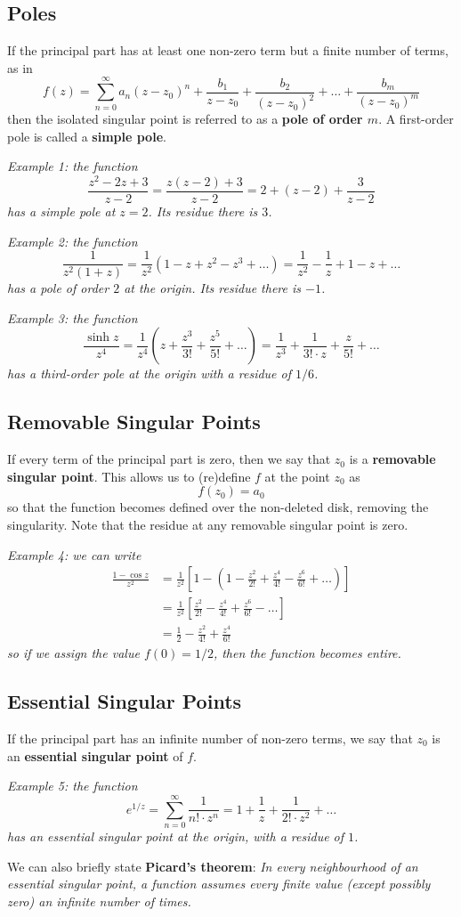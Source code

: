 \documentclass{article}
\renewcommand{\emph}{\textbf}
\begin{document}
\subsection{Poles}
If the principal part has at least one non-zero term but a finite number of terms, as in
\[
	f(z) = \sum_{n=0}^\infty a_n (z - z_0)^n
	+ \frac{b_1}{z - z_0}
	+ \frac{b_2}{(z - z_0)^2} + \dots
	+ \frac{b_m}{(z - z_0)^m}
\]
then the isolated singular point is referred to as a \emph{pole of order $m$}. A first-order pole is called a \emph{simple pole}.

\textit{Example 1: the function
\[
	\frac{z^2 - 2z + 3}{z - 2}
	= \frac{z(z-2) + 3}{z - 2}
	= 2 + (z - 2) + \frac{3}{z - 2}
\]
has a simple pole at $z = 2$. Its residue there is $3$.}

\textit{Example 2: the function
\[
	\frac{1}{z^2(1 + z)}
	= \frac{1}{z^2}(1 - z + z^2 - z^3 + \dots)
	= \frac{1}{z^2} - \frac{1}{z} + 1 - z + \dots
\]
has a pole of order $2$ at the origin. Its residue there is $-1$.}

\textit{Example 3: the function
\[
	\frac{\sinh z}{z^4}
	= \frac{1}{z^4} \left(z + \frac{z^3}{3!} + \frac{z^5}{5!} + \dots \right)
	= \frac{1}{z^3} + \frac{1}{3! \cdot z} + \frac{z}{5!} + \dots
\]
has a third-order pole at the origin with a residue of $1/6$.}

\subsection{Removable Singular Points}
If every term of the principal part is zero, then we say that $z_0$ is a \emph{removable singular point}. This allows us to (re)define $f$ at the point $z_0$ as
\[
	f(z_0) = a_0
\]
so that the function becomes defined over the non-deleted disk, removing the singularity. Note that the residue at any removable singular point is zero.

\textit{Example 4: we can write
\begin{align*}
	\frac{1 - \cos z}{z^2}
	&= \frac{1}{z^2} \left[ 1 - \left(1 - \frac{z^2}{2!} + \frac{z^4}{4!} - \frac{z^6}{6!} + \dots \right) \right] \\
	&= \frac{1}{z^2} \left[ \frac{z^2}{2!} - \frac{z^4}{4!} + \frac{z^6}{6!} - \dots \right] \\
	&= \frac{1}{2} - \frac{z^2}{4!} + \frac{z^4}{6!}
\end{align*}
so if we assign the value $f(0) = 1/2$, then the function becomes entire.}

\subsection{Essential Singular Points}
If the principal part has an infinite number of non-zero terms, we say that $z_0$ is an \emph{essential singular point} of $f$.

\textit{Example 5: the function
\[
	e^{1/z}
	= \sum_{n=0}^\infty \frac{1}{n! \cdot z^n}
	= 1 + \frac{1}{z} + \frac{1}{2! \cdot z^2} + \dots
\]
has an essential singular point at the origin, with a residue of $1$.}

We can also briefly state \emph{Picard's theorem}: \textit{In every neighbourhood of an essential singular point, a function assumes every finite value (except possibly zero) an infinite number of times.}
\end{document}
